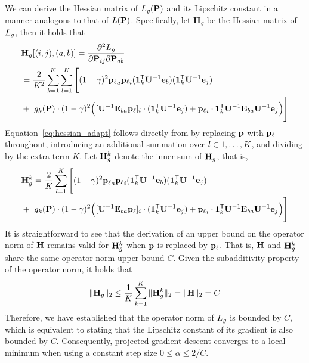 We can derive the Hessian matrix of $L_{\mathit{g}}(\mathbf{{P}})$ and its Lipschitz constant in a manner analogous to that of $L(\mathbf{{P}})$. Specifically, let $\textbf{H}_g$ be the Hessian matrix of $L_{\mathit{g}}$, then it holds that  
\begin{align}
\label{eq:hessian_adapt}
& \mathbf{{H}}_g[(i,j),(a,b)] = 
     \frac{\partial^2 L_{\mathit{g}}}{\partial \mathbf{{P}}_{ij} \partial \mathbf{{P}}_{ab}}  \\ \nonumber
& = \frac{2}{K^2} \sum_{k=1}^K \sum_{l=1}^K \Bigg[
        (1-\gamma)^2 {\mathbf{{p}}_{\ell}}_a {\mathbf{{p}}_{\ell}}_i (\mathbf{{1}}_{k}^{\mathsf{T}} \mathbf{{U}}^{-1} \mathbf{{e}}_b)(\mathbf{{1}}_{k}^{\mathsf{T}} \mathbf{{U}}^{-1} \mathbf{{e}}_j)\\ \nonumber
    &+\ g_k(\mathbf{{P}}) \cdot (1-\gamma)^2 \Big(
        [\mathbf{{U}}^{-1} \mathbf{{E}}_{ba} {\mathbf{{p}}_{\ell}}]_i \cdot (\mathbf{{1}}_{k}^{\mathsf{T}} \mathbf{{U}}^{-1} \mathbf{{e}}_j)
        + {\mathbf{{p}}_{\ell}}_i \cdot \mathbf{{1}}_{k}^{\mathsf{T}} \mathbf{{U}}^{-1} \mathbf{{E}}_{ba} \mathbf{{U}}^{-1} \mathbf{{e}}_j
    \Big)
\Bigg]
\end{align}
Equation~\eqref{eq:hessian_adapt} follows directly from  by replacing $\mathbf{{p}}$ with $\mathbf{{p}}_{\ell}$ throughout, introducing an additional summation over $l \in {1, \ldots, \ensuremath{K}}$, and dividing by the extra term $K$.
Let $\mathbf{{H}}_g^k$ denote the inner sum of $\mathbf{{H}}_g$, that is,
\begin{align*}
   & \mathbf{{H}}_g^k = \frac{2}{K} \sum_{l=1}^K \Bigg[
        (1-\gamma)^2 {\mathbf{{p}}_{\ell}}_a {\mathbf{{p}}_{\ell}}_i (\mathbf{{1}}_{k}^{\mathsf{T}} \mathbf{{U}}^{-1} \mathbf{{e}}_b)(\mathbf{{1}}_{k}^{\mathsf{T}} \mathbf{{U}}^{-1} \mathbf{{e}}_j)\\ \nonumber
    &+\ g_k(\mathbf{{P}}) \cdot (1-\gamma)^2 \Big(
        [\mathbf{{U}}^{-1} \mathbf{{E}}_{ba} {\mathbf{{p}}_{\ell}}]_i \cdot (\mathbf{{1}}_{k}^{\mathsf{T}} \mathbf{{U}}^{-1} \mathbf{{e}}_j)
        + {\mathbf{{p}}_{\ell}}_i \cdot \mathbf{{1}}_{k}^{\mathsf{T}} \mathbf{{U}}^{-1} \mathbf{{E}}_{ba} \mathbf{{U}}^{-1} \mathbf{{e}}_j
    \Big)
\Bigg]
\end{align*}
It is straightforward to see that the derivation of an upper bound on the operator norm of $\mathbf{{H}}$ remains valid for $\mathbf{{H}}_g^k$ when $\mathbf{{p}}$ is replaced by $\mathbf{{p}}_{\ell}$. That is, $\mathbf{{H}}$ and $\mathbf{{H}}_g^k$ share the same operator norm upper bound $C$. 
Given the subadditivity property of the operator norm, it holds that
\begin{equation*}
    \|\mathbf{{H}}_g\|_2 \leq \frac{1}{K} \sum_{k=1}^{K} \|\mathbf{{H}}_g^k\|_2 = \|\mathbf{{H}}\|_2 = C
\end{equation*}
Therefore, we have established that the operator norm of $L_{\mathit{g}}$ is bounded by $C$, which is equivalent to stating that the Lipschitz constant of its gradient is also bounded by $C$. Consequently, projected gradient descent converges to a local minimum when using a constant step size $0 \leq \alpha \leq 2/C$.


